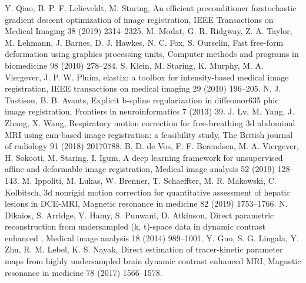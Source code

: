 \documentclass[num-refs]{wiley-article}
\begin{document}
\begin{thebibliography}{55}
	Y. Qiao, B. P. F. Lelieveldt, M. Staring, An efficient preconditioner forstochastic gradient descent optimization of image registration, IEEE Transactions on Medical Imaging 38 (2019) 2314--2325.
	M. Modat, G. R. Ridgway, Z. A. Taylor, M. Lehmann, J. Barnes, D. J.
	Hawkes, N. C. Fox, S. Ourselin, Fast free-form deformation using graphics
	processing units, Computer methods and programs in biomedicine 98 (2010) 278--284.
	S. Klein, M. Staring, K. Murphy, M. A. Viergever, J. P. W. Pluim, elastix: a
	toolbox for intensity-based medical image registration, IEEE transactions on medical imaging 29 (2010) 196--205.
	N. J. Tustison, B. B. Avants, Explicit b-spline regularization in diffeomor635 phic image registration, Frontiers in neuroinformatics 7 (2013) 39.
	J. Lv, M. Yang, J. Zhang, X. Wang, Respiratory motion correction for
	free-breathing 3d abdominal MRI using cnn-based image registration: a  feasibility study, The British journal of radiology 91 (2018) 20170788.
	B. D. de Vos, F. F. Berendsen, M. A. Viergever, H. Sokooti, M. Staring, I. Igum, A deep learning framework for unsupervised affine and deformable  image registration, Medical image analysis 52 (2019) 128–143.
	M. Ippoliti, M. Lukas, W. Brenner, T. Schaeffter, M. R. Makowski, C. Kolbitsch, 3d nonrigid motion correction for quantitative assessment of hepatic lesions in DCE-MRI, Magnetic resonance in medicine 82 (2019) 1753--1766.
	N. Dikaios, S. Arridge, V. Hamy, S. Punwani, D. Atkinson, Direct parametric reconstruction from undersampled (k, t)-space data in dynamic contrast enhanced , Medical image analysis 18 (2014) 989–1001.
	Y. Guo, S. G. Lingala, Y. Zhu, R. M. Lebel, K. S. Nayak, Direct estimation
	of tracer-kinetic parameter maps from highly undersampled brain dynamic	contrast enhanced MRI, Magnetic resonance in medicine 78 (2017) 1566--1578.
\end{thebibliography}
\end{document}
